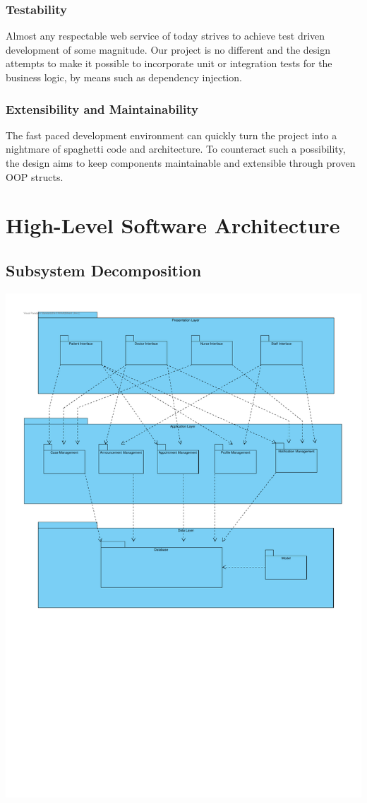 \documentclass[a4paper, 12pt, titlepage]{article}
\begin{document}
  \subsubsection{Testability}

  Almost any respectable web service of today strives to achieve test driven development of some magnitude.
  Our project is no different and the design attempts to make it possible to incorporate unit or integration tests
  for the business logic, by means such as dependency injection.

  \subsubsection{Extensibility and Maintainability}

  The fast paced development environment can quickly turn the project into a nightmare of spaghetti code and architecture.
  To counteract such a possibility, the design aims to keep components maintainable and extensible through proven OOP structs.

  \section{High-Level Software Architecture}

  \subsection{Subsystem Decomposition}

  \includegraphics[width=\linewidth]{subsystem}
\end{document}
